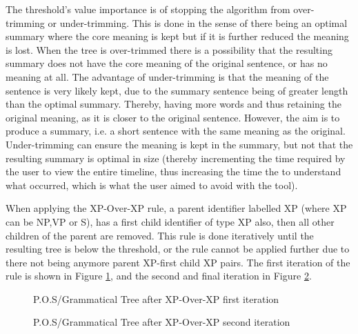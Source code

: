 \par The threshold's value importance is of stopping the algorithm from over-trimming or under-trimming. This is done in the sense of there being an optimal summary where the core meaning is kept but if it is further reduced the meaning is lost. When the tree is over-trimmed there is a possibility that the resulting summary does not have the core meaning of the original sentence, or has no meaning at all. The advantage of under-trimming is that the meaning of the sentence is very likely kept, due to the summary sentence being of greater length than the optimal summary. Thereby, having more words and thus retaining the original meaning, as it is closer to the original sentence. However, the aim is to produce a summary, i.e. a short sentence with the same meaning as the original. Under-trimming can ensure the meaning is kept in the summary, but not that the resulting summary is optimal in size (thereby incrementing the time required by the user to view the entire timeline, thus increasing the time the to understand what occurred, which is what the user aimed to avoid with the tool).
\par When applying the XP-Over-XP rule, a parent identifier labelled XP (where XP can be NP,VP or S), has a first child identifier of type XP also, then all other children of the parent are removed. This rule is done iteratively until the resulting tree is below the threshold, or the rule cannot be applied further due to there not being anymore parent XP-first child XP pairs. The first iteration of the rule is shown in Figure \ref{tree:xpOverXpFirst}, and the second and final iteration in Figure \ref{tree:xpOverXpSecond}.
\begin{figure}[h]
\caption{P.O.S/Grammatical Tree after XP-Over-XP first iteration}
\label{tree:xpOverXpFirst}
\end{figure}
\begin{figure}[h]
\caption{P.O.S/Grammatical Tree after XP-Over-XP second iteration}
\label{tree:xpOverXpSecond}
\end{figure}
